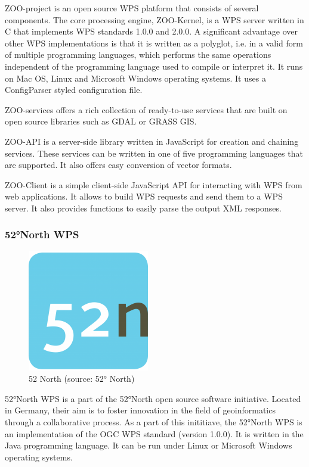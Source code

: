 ZOO-project is an open source WPS platform that consists of several
components. The core processing engine, ZOO-Kernel, is a WPS server
written in C that implements WPS standards 1.0.0 and 2.0.0.\cite{zoo}
A significant advantage over other WPS implementations is that it is
written as a polyglot, i.e. in a valid form of multiple programming
languages, which performs the same operations independent of the
programming language used to compile or interpret it.\cite{polyglot}
It runs on Mac OS, Linux and Microsoft Windows operating systems. It
uses a ConfigParser styled configuration file.

ZOO-services offers a rich collection of ready-to-use services that
are built on open source libraries such as GDAL or GRASS GIS.

ZOO-API is a server-side library written in JavaScript for creation
and chaining services. These services can be written in one of five
programming languages that are supported. It also offers easy
conversion of vector formats.

ZOO-Client is a simple client-side JavaScript API for interacting with
WPS from web applications. It allows to build WPS requests and send
them to a WPS server. It also provides functions to easily parse the
output XML responses.


\subsubsection{52°North WPS}
\begin{figure}[H] \centering
      \includegraphics[width=150pt]{./pictures/52n.png}
      \caption[52° North logo]{52 North (source: 52° North)}
      \label{fig:52 North}
  \end{figure}

52°North WPS is a part of the 52°North open source software
initiative. Located in Germany, their aim is to foster innovation in
the field of geoinformatics through a collaborative process. As a part
of this inititiave, the 52°North WPS is an implementation of the OGC
WPS standard (version 1.0.0). It is written in the Java programming
language. It can be run under Linux or Microsoft Windows operating
systems.

